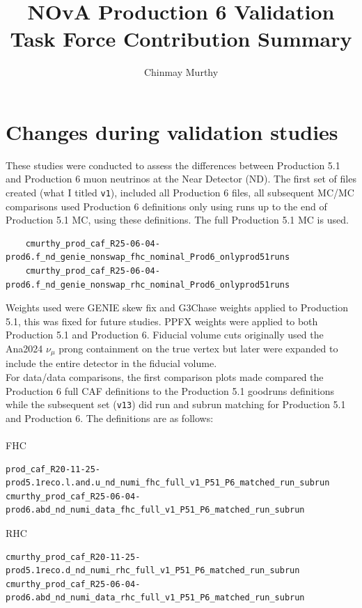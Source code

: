 \documentclass{article}
\title{NOvA Production 6 Validation Task Force Contribution Summary}
\author{Chinmay Murthy}
\begin{document}
\maketitle

\section{Changes during validation studies}
These studies were conducted to assess the differences between Production 5.1 and Production 6 muon neutrinos at the Near Detector (ND). The first set of files created (what I titled \texttt{v1}), included all Production 6 files, all subsequent MC/MC comparisons used Production 6 definitions only using runs up to the end of Production 5.1 MC, using these definitions. The full Production 5.1 MC is used.\cite{2026-02-26-prod6-validation}
\begin{verbatim}
    cmurthy_prod_caf_R25-06-04-prod6.f_nd_genie_nonswap_fhc_nominal_Prod6_onlyprod51runs
    cmurthy_prod_caf_R25-06-04-prod6.f_nd_genie_nonswap_rhc_nominal_Prod6_onlyprod51runs
\end{verbatim}
Weights used were GENIE skew fix and G3Chase weights applied to Production 5.1, this was fixed for future studies. PPFX weights were applied to both Production 5.1 and Production 6. Fiducial volume cuts originally used the Ana2024 $\nu_\mu$ prong containment on the true vertex but later were expanded to include the entire detector in the fiducial volume.\\
For data/data comparisons, the first comparison plots made compared the Production 6 full CAF definitions to the Production 5.1 goodruns definitions while the subsequent set (\texttt{v13}) did run and subrun matching for Production 5.1 and Production 6.\cite{2026-06-08-prod6-validation} The definitions are as follows:\\
\\
FHC
\begin{verbatim}
prod_caf_R20-11-25-prod5.1reco.l.and.u_nd_numi_fhc_full_v1_P51_P6_matched_run_subrun
cmurthy_prod_caf_R25-06-04-prod6.abd_nd_numi_data_fhc_full_v1_P51_P6_matched_run_subrun
\end{verbatim}
RHC
\begin{verbatim}
cmurthy_prod_caf_R20-11-25-prod5.1reco.d_nd_numi_rhc_full_v1_P51_P6_matched_run_subrun
cmurthy_prod_caf_R25-06-04-prod6.abd_nd_numi_data_rhc_full_v1_P51_P6_matched_run_subrun
\end{verbatim}
\end{document}
